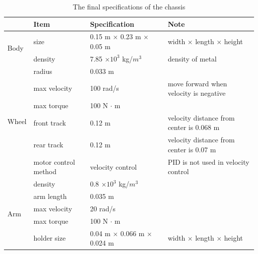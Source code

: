 \begin{table}[htbp]
    \centering
    \begin{tabular}{llll}
    \toprule
    \multicolumn{1}{l}{}    & \textbf{Item}                 & \textbf{Specification}                                        & \textbf{Note}               \\
    \midrule
\multirow{2}{*}{Body}   & size                 & 0.15 m $\times$ 0.23 m $\times$ 0.05 m               & width $\times$ length $\times$ height             \\
                        & density              & 7.85 $\times 10^3$ kg/$m^3$                          & density of metal                                  \\
\multirow{6}{*}{Wheel} & radius               & 0.033 m                                              &                                                   \\
                        & max velocity         & 100 rad/s                                            & move forward when velocity is negative          \\
                        & max torque           & 100 N $\cdot$ m                                       &                                                   \\
                        & front track          & 0.12 m                                               & velocity distance from center is 0.068 m          \\
                        & rear track           & 0.12 m                                               & velocity distance from center is 0.07 m           \\
                        & motor control method & velocity control                                     & PID is not used in velocity control               \\
\multirow{5}{*}{Arm}    & density              & 0.8 $\times 10^3$  kg/$m^3$                          &                                                   \\
                        & arm length           & 0.035 m                                              &                                                   \\
                        & max velocity         & 20 rad/s                                             &                                                   \\
                        & max torque           & 100 N $\cdot$ m                                       &                                                   \\
                        & holder size          & 0.04 m $\times$ 0.066 m $\times$ 0.024 m              & width $\times$ length $\times$ height             \\            
    \bottomrule
    \end{tabular}
    \caption{The final specifications of the chassis}
    \label{tab:final_specifications}
\end{table}
